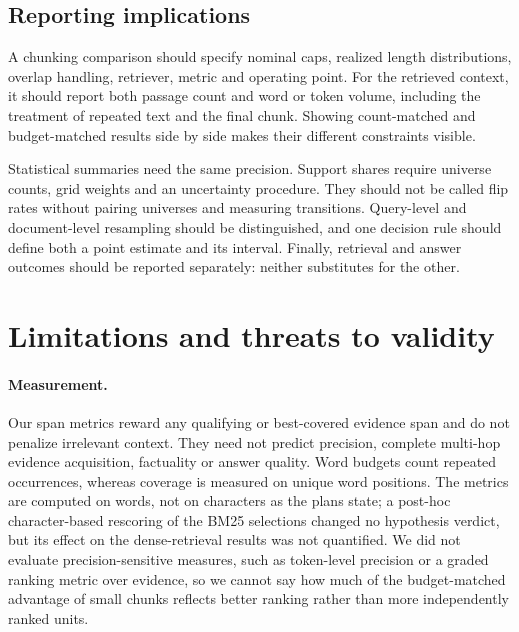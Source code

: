 \documentclass[11pt]{article}
\begin{document}
\subsection{Reporting implications}
A chunking comparison should specify nominal caps, realized length distributions, overlap handling, retriever, metric and operating point. For the retrieved context, it should report both passage count and word or token volume, including the treatment of repeated text and the final chunk. Showing count-matched and budget-matched results side by side makes their different constraints visible.

Statistical summaries need the same precision. Support shares require universe counts, grid weights and an uncertainty procedure. They should not be called flip rates without pairing universes and measuring transitions. Query-level and document-level resampling should be distinguished, and one decision rule should define both a point estimate and its interval. Finally, retrieval and answer outcomes should be reported separately: neither substitutes for the other.

\section{Limitations and threats to validity}\label{sec:limitations}
\paragraph{Measurement.}
Our span metrics reward any qualifying or best-covered evidence span and do not penalize irrelevant context. They need not predict precision, complete multi-hop evidence acquisition, factuality or answer quality. Word budgets count repeated occurrences, whereas coverage is measured on unique word positions. The metrics are computed on words, not on characters as the plans state; a post-hoc character-based rescoring of the BM25 selections changed no hypothesis verdict, but its effect on the dense-retrieval results was not quantified. We did not evaluate precision-sensitive measures, such as token-level precision or a graded ranking metric over evidence, so we cannot say how much of the budget-matched advantage of small chunks reflects better ranking rather than more independently ranked units.
\end{document}
